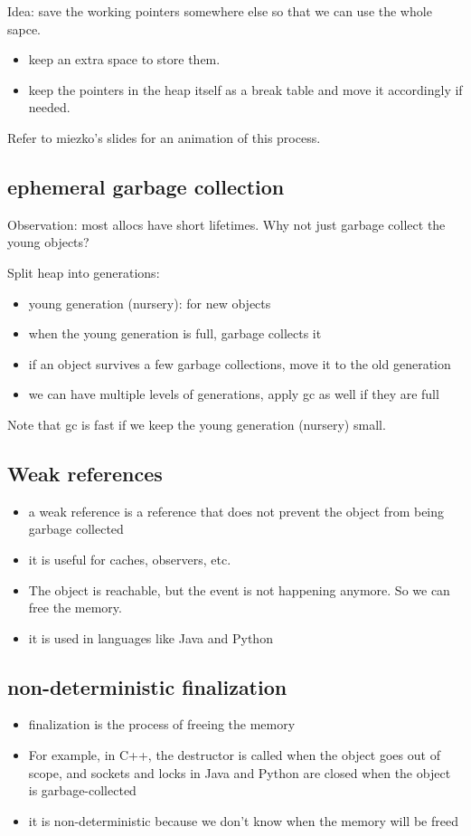 \documentclass[letterpaper,12pt]{article}
\begin{document}
Idea: save the working pointers somewhere else so that we can use the whole
sapce. \begin{itemize}
    \item keep an extra space to store them.
    \item keep the pointers in the heap itself as a break table and move it accordingly
          if needed.
\end{itemize}
Refer to miezko's slides for an animation of this process.

\subsection{ephemeral garbage collection}
Observation: most allocs have short lifetimes. Why not just garbage collect the
young objects?

Split heap into generations:\begin{itemize}
    \item young generation (nursery): for new objects
    \item when the young generation is full, garbage collects it
    \item if an object survives a few garbage collections, move it to the old generation
    \item we can have multiple levels of generations, apply gc as well if they are full
\end{itemize}
Note that gc is fast if we keep the young generation (nursery) small.
\subsection{Weak references}
\begin{itemize}
    \item a weak reference is a reference that does not prevent the object from being
          garbage collected
    \item it is useful for caches, observers, etc.
    \item The object is reachable, but the event is not happening anymore. So we can free
          the memory.
    \item it is used in languages like Java and Python
\end{itemize}
\subsection{non-deterministic finalization}
\begin{itemize}
    \item finalization is the process of freeing the memory
    \item For example, in C++, the destructor is called when the object goes out of
          scope, and sockets and locks in Java and Python are closed when the object is
          garbage-collected
    \item it is non-deterministic because we don't know when the memory will be freed
\end{itemize}
\end{document}
